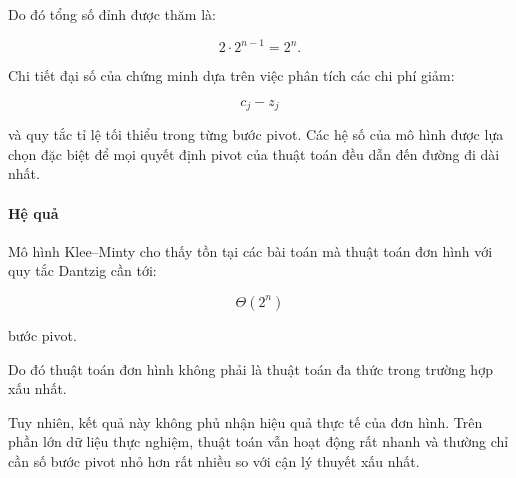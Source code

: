 \documentclass[fontsize=13pt,a4paper]{report}
\begin{document}
Do đó tổng số đỉnh được thăm là:

\[
2\cdot 2^{n-1}=2^n.
\]

Chi tiết đại số của chứng minh dựa trên việc phân tích các chi phí giảm:

\[
c_j-z_j
\]

và quy tắc tỉ lệ tối thiểu trong từng bước pivot. Các hệ số của mô hình được lựa chọn đặc biệt để mọi quyết định pivot của thuật toán đều dẫn đến đường đi dài nhất.

\paragraph{Hệ quả}

Mô hình Klee--Minty cho thấy tồn tại các bài toán mà thuật toán đơn hình với quy tắc Dantzig cần tới:

\[
\Theta(2^n)
\]

bước pivot.

Do đó thuật toán đơn hình không phải là thuật toán đa thức trong trường hợp xấu nhất.

Tuy nhiên, kết quả này không phủ nhận hiệu quả thực tế của đơn hình. Trên phần lớn dữ liệu thực nghiệm, thuật toán vẫn hoạt động rất nhanh và thường chỉ cần số bước pivot nhỏ hơn rất nhiều so với cận lý thuyết xấu nhất.







\end{document}
